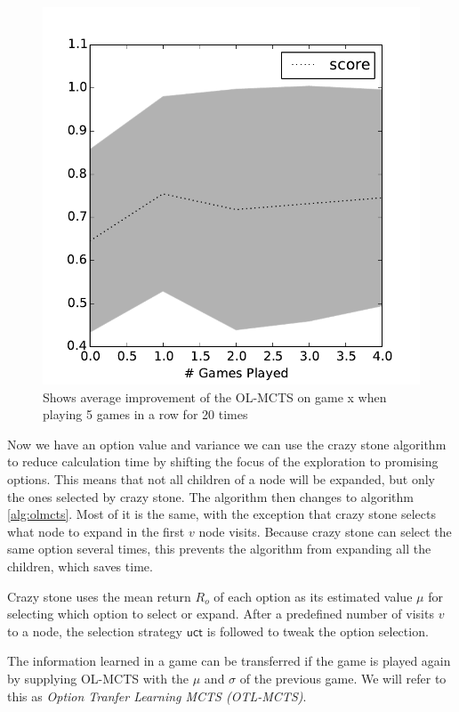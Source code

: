 \begin{figure}
	\centering
	\includegraphics[width=\columnwidth]{includes/learning}
	\caption{Shows average improvement of the OL-MCTS on game x when playing 5
		games in a row for 20 times}
	\label{fig:learning-results}
\end{figure}

Now we have an option value and variance we can use the crazy stone algorithm
to reduce calculation time by shifting the focus of the exploration to promising
options. This means that not all children of a node will be expanded, but only
the ones selected by crazy stone. The algorithm then changes to algorithm
\ref{alg:olmcts}. Most of it is the same, with the exception that crazy stone
selects what node to expand in the first $v$ node visits. Because crazy stone
can select the same option several times, this prevents the algorithm from
expanding all the children, which saves time. 

Crazy stone uses the mean return $R_o$ of each option as its estimated value
$\mu$ for selecting which option to select or expand. After a predefined number
of visits $v$ to a node, the selection strategy $\mathsf{uct}$ is followed to
tweak the option selection.



The information learned in a game can be transferred if the game is played
again by supplying OL-MCTS with the $\mu$ and $\sigma$ of the previous game. We
will refer to this as \emph{Option Tranfer Learning MCTS (OTL-MCTS)}.
